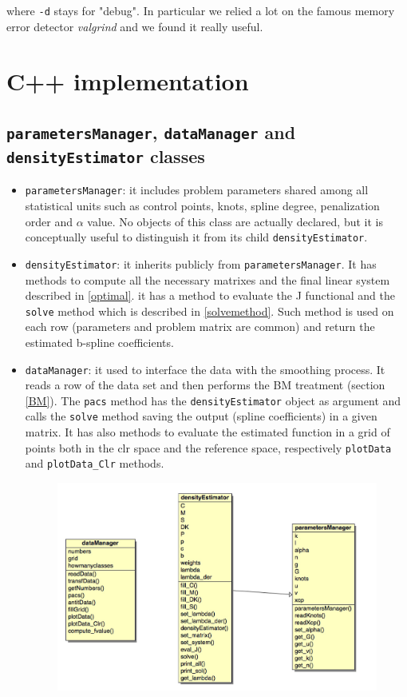 where \verb|-d| stays for "debug". In particular we relied a lot on the famous memory error detector \emph{valgrind} and we found it really useful.

\section{C++ implementation} \label{c++}

\subsection{\texttt{parametersManager}, \texttt{dataManager} and \texttt{densityEstimator} classes}

\begin{itemize}
\item \verb|parametersManager|: it includes problem parameters shared among all statistical units such as control points, knots, spline degree, penalization order and $\alpha$ value. No objects of this class are actually declared, but it is conceptually useful to distinguish it from its child \verb|densityEstimator|.

\item \verb|densityEstimator|: it inherits publicly from \verb|parametersManager|. It has methods to compute all the necessary matrixes and the final linear system described in \ref{optimal}. it has a method to evaluate the J functional and the \verb|solve| method which is described in \ref{solvemethod}. Such method is used on each row (parameters and problem matrix are common) and return the estimated b-spline coefficients.

\item \verb|dataManager|: it used to interface the data with the smoothing process. It reads a row of the data set and then performs the BM treatment (section \ref{BM}). The \verb|pacs| method has the \verb|densityEstimator| object as argument and calls the \verb|solve| method saving the output (spline coefficients) in a given matrix. It has also methods to evaluate the estimated function in a grid of points both in the clr space and the reference space, respectively \verb|plotData| and \verb|plotData_Clr| methods.

\begin{figure}[ht]
	
	
	\includegraphics[width=\textwidth]{./pictures/classes/class_diagram.jpg}
	\label{fig:diagram}


\end{figure}
\end{itemize}
